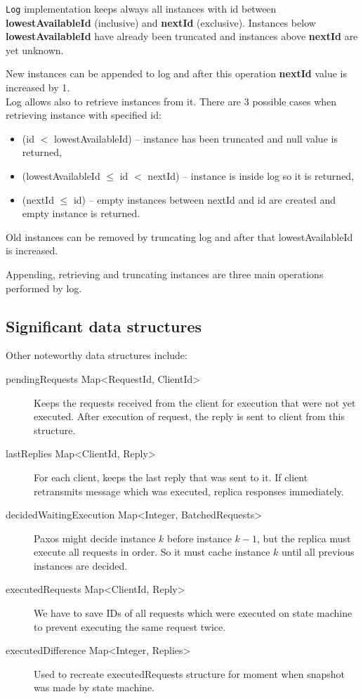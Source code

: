 \texttt{Log} implementation keeps always all instances with id between \textbf{lowestAvailableId} (inclusive) and \textbf{nextId} (exclusive). Instances below \textbf{lowestAvailableId} have already been truncated and instances above \textbf{nextId} are yet unknown.

New instances can be appended to log and after this operation \textbf{nextId} value is increased by 1. \\Log allows also to retrieve instances from it. There are 3 possible cases when retrieving instance with specified id:
\begin{itemize}
  \item (id $<$ lowestAvailableId) -- instance has been truncated and null value is returned,
  \item (lowestAvailableId $\leq$ id $<$ nextId) -- instance is inside log so it is returned,
  \item (nextId $\leq$ id) -- empty instances between nextId and id are created and empty instance is returned.
\end{itemize}
Old instances can be removed by truncating log and after that lowestAvailableId is increased. 

Appending, retrieving and truncating instances are three main operations per\-for\-med by log.

\subsection{Significant data structures}
Other noteworthy data structures include:
\label{subsubsec:significant_structures}
  \begin{description}
    \item[pendingRequests Map\textless RequestId, ClientId\textgreater] Keeps the requests received from the client for execution that were not yet executed. After execution of request, the reply is sent to client from this structure.
    \item[lastReplies Map\textless ClientId, Reply\textgreater] For each client, keeps the last reply that was sent to it. If client retransmits message which was executed, replica responses immediately.
    \item[decidedWaitingExecution Map\textless Integer, BatchedRequests\textgreater] Paxos might decide in\-stan\-ce $k$ before instance $k-1$, but the replica must execute all requests in order. So it must cache in\-stan\-ce $k$ until all previous instances are decided.
    \item[executedRequests Map\textless ClientId, Reply\textgreater] We have to save IDs of all requests which were executed on state machine to prevent executing the same request twice.
	\item[executedDifference Map\textless Integer, Replies\textgreater] Used to recreate executedRequests stru\-ctu\-re for moment when snapshot was made by state machine.
  \end{description}



